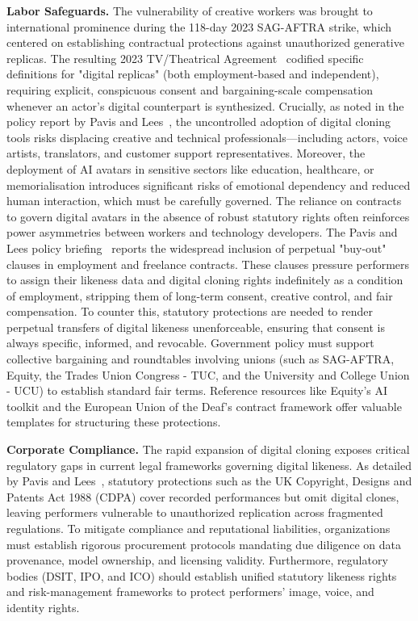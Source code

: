 \documentclass[pdflatex,sn-mathphys-num]{sn-jnl}
\theoremstyle{thmstyleone}
\theoremstyle{thmstyletwo}
\theoremstyle{thmstylethree}
\begin{document}
\textbf{Labor Safeguards.} The vulnerability of creative workers was brought to international prominence during the 118-day 2023 SAG-AFTRA strike, which centered on establishing contractual protections against unauthorized generative replicas. The resulting 2023 TV/Theatrical Agreement~\cite{sagaftra2023summary} codified specific definitions for "digital replicas" (both employment-based and independent), requiring explicit, conspicuous consent and bargaining-scale compensation whenever an actor's digital counterpart is synthesized. Crucially, as noted in the policy report by Pavis and Lees~\cite{pavis2025ai, signapselinkedin}, the uncontrolled adoption of digital cloning tools risks displacing creative and technical professionals—including actors, voice artists, translators, and customer support representatives. Moreover, the deployment of AI avatars in sensitive sectors like education, healthcare, or memorialisation introduces significant risks of emotional dependency and reduced human interaction, which must be carefully governed. The reliance on contracts to govern digital avatars in the absence of robust statutory rights often reinforces power asymmetries between workers and technology developers. The Pavis and Lees policy briefing~\cite{pavis2025ai, signapselinkedin} reports the widespread inclusion of perpetual "buy-out" clauses in employment and freelance contracts. These clauses pressure performers to assign their likeness data and digital cloning rights indefinitely as a condition of employment, stripping them of long-term consent, creative control, and fair compensation. To counter this, statutory protections are needed to render perpetual transfers of digital likeness unenforceable, ensuring that consent is always specific, informed, and revocable. Government policy must support collective bargaining and roundtables involving unions (such as SAG-AFTRA, Equity, the Trades Union Congress - TUC, and the University and College Union - UCU) to establish standard fair terms. Reference resources like Equity's AI toolkit and the European Union of the Deaf's contract framework offer valuable templates for structuring these protections.

\textbf{Corporate Compliance.} The rapid expansion of digital cloning exposes critical regulatory gaps in current legal frameworks governing digital likeness. As detailed by Pavis and Lees~\cite{pavis2025ai, signapselinkedin}, statutory protections such as the UK Copyright, Designs and Patents Act 1988 (CDPA) cover recorded performances but omit digital clones, leaving performers vulnerable to unauthorized replication across fragmented regulations. To mitigate compliance and reputational liabilities, organizations must establish rigorous procurement protocols mandating due diligence on data provenance, model ownership, and licensing validity. Furthermore, regulatory bodies (DSIT, IPO, and ICO) should establish unified statutory likeness rights and risk-management frameworks to protect performers' image, voice, and identity rights.
\end{document}
